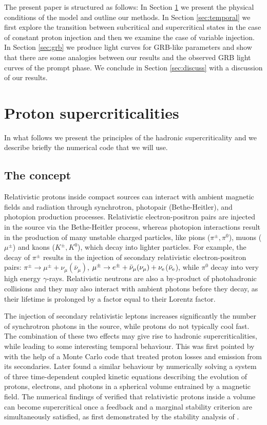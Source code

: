 \documentclass[fleqn,usenatbib]{mnras}
\begin{document}
{The present paper is structured as follows:
 In Section \ref{sec:model} we present the physical conditions of the model and outline our methods.  
In Section \ref{sec:temporal}  we first explore the transition between
subcritical and supercritical states in the case of constant proton injection and then 
we examine the case of variable injection. In Section \ref{sec:grb} we produce light curves for GRB-like  parameters and show that there are some analogies between our results
and the observed GRB light curves of the prompt phase.
We conclude in Section \ref{sec:discuss} with a discussion of our results.
 
\section{Proton supercriticalities}\label{sec:model}
In what follows we present the principles of the hadronic supercriticality and we describe briefly the numerical code that we will use.
\subsection{The concept}
Relativistic protons inside compact sources can interact with 
ambient magnetic fields and radiation through synchrotron,  photopair (Bethe-Heitler), and photopion production processes. 
Relativistic electron-positron pairs are injected in the source via the Bethe-Heitler process, whereas 
photopion interactions result in the production of many unstable charged particles, like
pions ($\pi^{\pm}, \pi^0$), muons ($\mu^{\pm}$) and kaons ($K^{\pm}, K^0$), which decay into lighter particles. For example, 
the decay of $\pi^{\pm}$ results in the injection of secondary relativistic 
electron-positron pairs: $\pi^{\pm} \rightarrow \mu^{\pm}+\nu_{\mu}(\bar{\nu}_{\mu})$, $\mu^{\pm}\rightarrow e^{\pm}+\bar{\nu}_{\mu}(\nu_{\mu})+\nu_{\rm e}$($\bar{\nu}_{\rm e}$), while $\pi^0$ decay into very high energy $\gamma$-rays. Relativistic neutrons are also a by-product of photohadronic collisions and they may also interact with ambient photons before they decay, as their lifetime is prolonged by a factor equal to their Lorentz factor. 

The injection of secondary relativistic leptons increases significantly the number of synchrotron photons in the source, while protons do not typically cool fast. The combination of these two effects may give rise to hadronic supercriticalities, while leading to some interesting temporal behaviour. This was first pointed by  \cite{sternsvensson91} with the help of a Monte Carlo code that treated proton losses and emission from its secondaries. Later \cite{mastkirk95} found a similar behaviour by numerically solving a system of three time-dependent coupled kinetic equations  describing the evolution of protons, electrons,  and photons in a spherical
volume entrained by a magnetic field. The numerical findings of \cite{mastkirk95} verified that  
relativistic protons inside a volume can become supercritical once a feedback and a marginal stability criterion are simultaneously satisfied, as first demonstrated by the stability analysis of \cite{kirkmast92}.  

}
\end{document}

